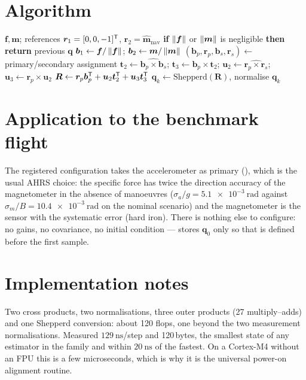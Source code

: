 \section{Algorithm}
\begin{algorithm}[H]
\caption{TRIAD --- one sampling period (the gyroscope is ignored)}
\begin{algorithmic}[1]
\Require $\bm{f},\bm{m}$; references $\bm{r}_1=[0,0,-1]^{\mathsf{T}}$, $\bm{r}_2=\hat{\bm{m}}_{\text{nav}}$
\State \textbf{if} $\left\lVert \bm{f} \right\rVert$ or $\left\lVert \bm{m} \right\rVert$ is negligible \textbf{then return} previous $\bm{q}$
\State $\bm{b}_1\gets\bm{f}/\left\lVert \bm{f} \right\rVert$;\; $\bm{b}_2\gets\bm{m}/\left\lVert \bm{m} \right\rVert$
\State $(\bm{b}_p,\bm{r}_p,\bm{b}_s,\bm{r}_s)\gets$ primary/secondary assignment
\State $\bm{t}_2\gets\widehat{\bm{b}_p\times\bm{b}_s}$;\; $\bm{t}_3\gets\bm{b}_p\times\bm{t}_2$;\;
       $\bm{u}_2\gets\widehat{\bm{r}_p\times\bm{r}_s}$;\; $\bm{u}_3\gets\bm{r}_p\times\bm{u}_2$
\State $\bm{R}\gets\bm{r}_p\bm{b}_p^{\mathsf{T}}+\bm{u}_2\bm{t}_2^{\mathsf{T}}+\bm{u}_3\bm{t}_3^{\mathsf{T}}$ \Comment{\eqref{eq:tr-R}}
\State $\bm{q}_k\gets\text{Shepperd}(\bm{R})$, normalise
\Ensure $\bm{q}_k$
\end{algorithmic}
\end{algorithm}

\section{Application to the benchmark flight}
The registered configuration takes the accelerometer as primary (), which is the
usual AHRS choice: the specific force has twice the direction accuracy of the
magnetometer in the absence of manoeuvres ($\sigma_a/g=\SI{5.1e-3}{\radian}$ against
$\sigma_m/B=\SI{10.4e-3}{\radian}$ on the nominal scenario) and the magnetometer is the sensor with
the systematic error (hard iron). There is nothing else to configure: no gains, no covariance, no
initial condition ---  stores $\bm{q}_0$ only so that  is defined
before the first sample.

\section{Implementation notes}
Two cross products, two normalisations, three outer products (27 multiply--adds) and one Shepperd
conversion: about 120 flops, one  beyond the two measurement normalisations. Measured
$\SI{129}{\nano\second}$/step and 120\,bytes, the smallest state of any estimator in the family and
within $\SI{20}{\nano\second}$ of the fastest. On a Cortex-M4 without an FPU this is a few
microseconds, which is why it is the universal power-on alignment routine.

